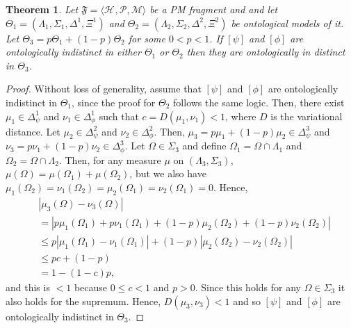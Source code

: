 \documentclass[DIV=calc,fontsize=12pt]{scrartcl} %
\theoremstyle{definition}
\theoremstyle{plain}
\newtheorem{theorem}[definition]{Theorem}
\newcommand{\Proj}[1]{\ensuremath{\left [ #1 \right ]}}
\newcommand{\Hilb}[1][]{\ensuremath{\mathcal{H}_{#1}}}
\begin{document}
\begin{theorem}
\label{the:Pair:ind}
Let $\mathfrak{F} = \langle \Hilb, \mathcal{P}, \mathcal{M} \rangle$
be a PM fragment and and let $\Theta_1 = (\Lambda_1, \Sigma_1,
\Delta^1, \Xi^1)$ and $\Theta_2 = (\Lambda_2, \Sigma_2, \Delta^2,
\Xi^2)$ be ontological models of it.  Let $\Theta_3 = p \Theta_1 +
(1-p)\Theta_2$ for some $0 < p < 1$.  If $\Proj{\psi}$ and
$\Proj{\phi}$ are ontologically indistinct in either $\Theta_1$ or
$\Theta_2$ then they are ontologically in distinct in $\Theta_3$.
\end{theorem}
\begin{proof}
Without loss of generality, assume that $\Proj{\psi}$ and
$\Proj{\phi}$ are ontologically indistinct in $\Theta_1$, since the
proof for $\Theta_2$ follows the same logic.  Then, there exist $\mu_1
\in \Delta^1_{\psi}$ and $\nu_1 \in \Delta^1_{\phi}$ such that
$c = D(\mu_1, \nu_1) < 1$, where $D$ is the variational distance.  Let
$\mu_2 \in \Delta^2_{\psi}$ and $\nu_2 \in \Delta^2_{\phi}$.  Then,
$\mu_3 = p \mu_1 + (1-p)\mu_2 \in \Delta^3_{\psi}$ and $\nu_3 = p
\nu_1 + (1-p) \nu_2 \in \Delta^3_{\phi}$.  Let $\Omega \in \Sigma_3$
and define $\Omega_1 = \Omega \cap \Lambda_1$ and $\Omega_2 = \Omega
\cap \Lambda_2$.  Then, for any measure $\mu$ on $(\Lambda_3,
\Sigma_3)$, $\mu(\Omega) = \mu(\Omega_1) + \mu(\Omega_2)$, but we
also have $\mu_1(\Omega_2) = \nu_1(\Omega_2) = \mu_2(\Omega_1) =
\nu_2(\Omega_1) = 0$.  Hence,
\begin{align}
&\left | \mu_3(\Omega) - \nu_3(\Omega) \right | \nonumber\\
& = \left |
p\mu_1(\Omega_1) + p\nu_1(\Omega_1) +
(1-p)\mu_2(\Omega_2) + (1-p)\nu_2(\Omega_2) \right | \\
& \leq p \left | \mu_1(\Omega_1) - \nu_1(\Omega_1) \right | +
(1-p) \left | \mu_2(\Omega_2) - \nu_2(\Omega_2) \right | \\
& \leq p c + (1-p) \\
& = 1 - (1-c)p,
\end{align}
and this is $< 1$ because $0 \leq c < 1$ and $p > 0$.  Since this
holds for any $\Omega \in \Sigma_3$ it also holds for the supremum.
Hence, $D(\mu_3,\nu_3) < 1$ and so $\Proj{\psi}$ and $\Proj{\phi}$
are ontologically indistinct in $\Theta_3$.
\end{proof}
\end{document}
